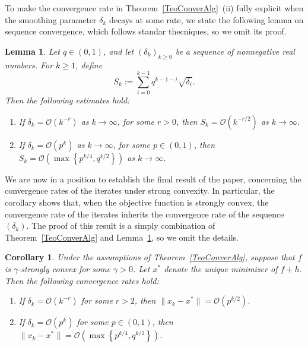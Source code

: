 \documentclass[11pt]{article}
\newcommand{\1}{\mathds{1}}
\newtheorem{lemma}[theorem]{Lemma}
\newtheorem{corollary}[theorem]{Corollary}
\theoremstyle{definition}
\theoremstyle{remark}
\theoremstyle{definition}
\begin{document}
To make the convergence rate in Theorem~\ref{TeoConverAlg}~(ii) fully explicit when the smoothing parameter $\delta_k$ decays at some rate, we state the following  lemma on sequence convergence, which follows standar thecniques, so we omit its proof.
\begin{lemma}\label{LemmaRates}
Let \(q\in(0,1)\), and let \((\delta_k)_{k\geq 0}\) be a sequence of
nonnegative real numbers. For \(k\geq 1\), define
\[
    S_k:=\sum_{i=0}^{k-1} q^{k-1-i}\sqrt{\delta_i}.
\]
Then the following estimates hold:
\begin{enumerate}
    \item[(i)] If \(\delta_k=\mathcal{O}(k^{-r})\) as \(k\to\infty\), for some
    \(r>0\), then $  S_k=\mathcal{O}(k^{-r/2})$ as $k\to\infty$.

    \item[(ii)] If \(\delta_k=\mathcal{O}(p^k)\) as \(k\to\infty\), for some
    \(p\in(0,1)\), then $  S_k=
        \mathcal{O}\left(
        \max\left\{p^{k/4},q^{k/2}\right\}
        \right)$ as $k\to\infty$.
\end{enumerate}
\end{lemma}
We are now in a position to establish the final result of the paper, concerning the convergence rates of the iterates under strong convexity. In particular, the corollary shows that, when the objective function is strongly convex, the convergence rate of the iterates inherits the convergence rate of the sequence $(\delta_k)$. The proof of this result is a simply combination of Theorem~\ref{TeoConverAlg} and Lemma~\ref{LemmaRates}, so we omit the details.

\begin{corollary}
Under the assumptions of Theorem~\ref{TeoConverAlg}, suppose that \(f\) is
\(\gamma\)-strongly convex for some \(\gamma>0\). Let \(x^\ast\) denote the
unique minimizer of \(f+h\). Then the following convergence rates hold:
\begin{enumerate}
    \item[(i)] If \(\delta_k=\mathcal{O}(k^{-r})\) for some \(r>2\), then $\|x_k-x^\ast\| = \mathcal{O}(p^{k/2})$.

    \item[(ii)] If \(\delta_k=\mathcal{O}(p^k)\) for some \(p\in(0,1)\), then $ \|x_k-x^\ast\|
        =
        \mathcal{O}\left(
        \max\left\{p^{k/4},q^{k/2}\right\}
        \right)$.
\end{enumerate}
\end{corollary}
\end{document}
